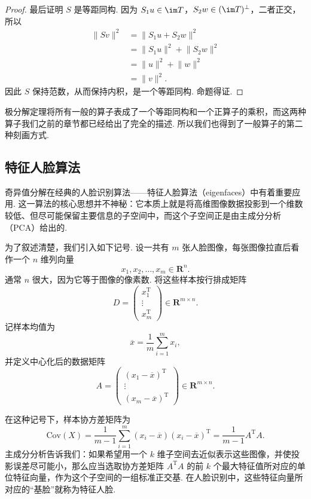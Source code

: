 \begin{proof}
    最后证明 $S$ 是等距同构. 因为 $S_1u \in \im T$，$S_2w \in (\im T)^\perp$，二者正交，所以
    \begin{align*}
        \lVert Sv \rVert^2
         & = \lVert S_1u + S_2w \rVert^2 \\
         & = \lVert S_1u \rVert^2 + \lVert S_2w \rVert^2 \\
         & = \lVert u \rVert^2 + \lVert w \rVert^2 \\
         & = \lVert v \rVert^2.
    \end{align*}
    因此 $S$ 保持范数，从而保持内积，是一个等距同构. 命题得证.
\end{proof}

极分解定理将所有一般的算子表成了一个等距同构和一个正算子的乘积，而这两种算子我们之前的章节都已经给出了完全的描述. 所以我们也得到了一般算子的第二种刻画方式.

\subsection{特征人脸算法}

奇异值分解在经典的人脸识别算法——特征人脸算法（eigenfaces）中有着重要应用. 这一算法的核心思想并不神秘：它本质上就是将高维图像数据投影到一个维数较低、但尽可能保留主要信息的子空间中，而这个子空间正是由主成分分析（PCA）给出的.

为了叙述清楚，我们引入如下记号. 设一共有 $m$ 张人脸图像，每张图像拉直后看作一个 $n$ 维列向量
\[
    x_1, x_2, \ldots, x_m \in \mathbf{R}^n.
\]
通常 $n$ 很大，因为它等于图像的像素数. 将这些样本按行排成矩阵
\[
    D =
    \begin{pmatrix}
        x_1^{\mathrm{T}} \\
        \vdots           \\
        x_m^{\mathrm{T}}
    \end{pmatrix}
    \in \mathbf{R}^{m \times n}.
\]
记样本均值为
\[
    \overline{x} = \frac{1}{m}\sum_{i=1}^m x_i,
\]
并定义中心化后的数据矩阵
\[
    A =
    \begin{pmatrix}
        (x_1-\overline{x})^{\mathrm{T}} \\
        \vdots                          \\
        (x_m-\overline{x})^{\mathrm{T}}
    \end{pmatrix}
    \in \mathbf{R}^{m \times n}.
\]

在这种记号下，样本协方差矩阵为
\[
    \mathrm{Cov}(X)
    = \frac{1}{m-1}\sum_{i=1}^m (x_i-\overline{x})(x_i-\overline{x})^{\mathrm{T}}
    = \frac{1}{m-1}A^{\mathrm{T}}A.
\]
主成分分析告诉我们：如果希望用一个 $k$ 维子空间去近似表示这些图像，并使投影误差尽可能小，那么应当选取协方差矩阵 $A^{\mathrm{T}}A$ 的前 $k$ 个最大特征值所对应的单位特征向量，作为这个子空间的一组标准正交基. 在人脸识别中，这些特征向量所对应的“基脸”就称为特征人脸.

